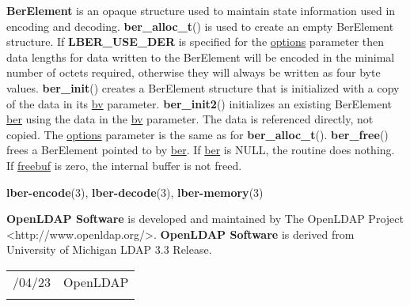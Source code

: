\documentclass[]{article}
\let\realtextbf=\textbf
\renewcommand{\textbf}[1]{\textcolor{boldcolor}{\realtextbf{#1}}}
\renewcommand{\emph}[1]{\underline{#1}}
\begin{document}
\textbf{BerElement} is an opaque structure used to maintain state
information used in encoding and decoding. \textbf{ber\_alloc\_t}() is
used to create an empty BerElement structure. If \textbf{LBER\_USE\_DER}
is specified for the \emph{options} parameter then data lengths for data
written to the BerElement will be encoded in the minimal number of
octets required, otherwise they will always be written as four byte
values. \textbf{ber\_init}() creates a BerElement structure that is
initialized with a copy of the data in its \emph{bv} parameter.
\textbf{ber\_init2}() initializes an existing BerElement \emph{ber}
using the data in the \emph{bv} parameter. The data is referenced
directly, not copied. The \emph{options} parameter is the same as for
\textbf{ber\_alloc\_t}(). \textbf{ber\_free}() frees a BerElement
pointed to by \emph{ber}. If \emph{ber} is NULL, the routine does
nothing. If \emph{freebuf} is zero, the internal buffer is not freed.


\textbf{lber-encode}(3), \textbf{lber-decode}(3),
\textbf{lber-memory}(3)


\textbf{OpenLDAP Software} is developed and maintained by The OpenLDAP
Project \textless{}http://www.openldap.org/\textgreater{}.
\textbf{OpenLDAP Software} is derived from University of Michigan LDAP
3.3 Release.

\begin{longtable}[c]{@{}ll@{}}
\toprule\addlinespace
2012/04/23 & OpenLDAP
\\\addlinespace
\bottomrule
\end{longtable}
\end{document}
